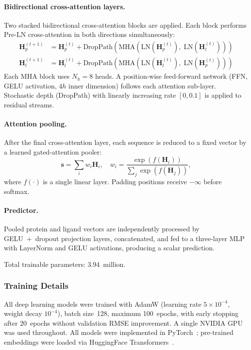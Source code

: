 \documentclass[11pt,twocolumn]{article}
\begin{document}
\paragraph{Bidirectional cross-attention layers.}
Two stacked bidirectional cross-attention blocks are applied.  Each block
performs Pre-LN cross-attention in both directions simultaneously:
\begin{align}
  \mathbf{H}_p^{(t+1)} &= \mathbf{H}_p^{(t)} + \text{DropPath}(\text{MHA}(\text{LN}(\mathbf{H}_p^{(t)}),\; \text{LN}(\mathbf{H}_l^{(t)}))) \\
  \mathbf{H}_l^{(t+1)} &= \mathbf{H}_l^{(t)} + \text{DropPath}(\text{MHA}(\text{LN}(\mathbf{H}_l^{(t)}),\; \text{LN}(\mathbf{H}_p^{(t)})))
\end{align}
Each MHA block uses $N_h=8$ heads.  A position-wise feed-forward network
(FFN, GELU activation, $4h$ inner dimension) follows each attention
sub-layer.  Stochastic depth (DropPath) with linearly increasing rate
$[0, 0.1]$ is applied to residual streams.

\paragraph{Attention pooling.}
After the final cross-attention layer, each sequence is reduced to a fixed
vector by a learned gated-attention pooler:
\[
  \boldsymbol{s} = \sum_{i} w_i \mathbf{H}_i, \quad
  w_i = \frac{\exp(f(\mathbf{H}_i))}{\sum_j \exp(f(\mathbf{H}_j))},
\]
where $f(\cdot)$ is a single linear layer.  Padding positions receive
$-\infty$ before softmax.

\paragraph{Predictor.}
Pooled protein and ligand vectors are independently processed by
GELU~+~dropout projection layers, concatenated, and fed to a three-layer MLP
with LayerNorm and GELU activations, producing a scalar prediction.

Total trainable parameters: 3.94~million.

\subsubsection{Training Details}
All deep learning models were trained with AdamW (learning rate
$5 \times 10^{-4}$, weight decay $10^{-4}$), batch size~128, maximum
100~epochs, with early stopping after 20~epochs without validation RMSE
improvement.  A single NVIDIA GPU was used throughout.  All models were
implemented in PyTorch~\cite{paszke2019pytorch}; pre-trained embeddings
were loaded via HuggingFace Transformers~\cite{wolf2020transformers}.
\end{document}
